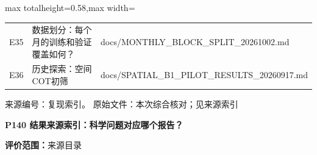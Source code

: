 \documentclass[UTF8,a4paper,landscape,10pt]{ctexart}
\begin{document}
\begin{center}
\begin{adjustbox}{max totalheight=0.58\textheight,max width=\linewidth}
\begin{minipage}{\linewidth}
\begin{tabularx}{\linewidth}{>{\hsize=0.3000\hsize\raggedright\arraybackslash}X>{\hsize=0.9000\hsize\raggedright\arraybackslash}X>{\hsize=1.8000\hsize\raggedright\arraybackslash}X}
E35 & 数据划分：每个月的训练和验证覆盖如何？ & docs/\allowbreak{}MONTHLY\_\allowbreak{}BLOCK\_\allowbreak{}SPLIT\_\allowbreak{}20261002.md \\
E36 & 历史探索：空间COT初筛 & docs/\allowbreak{}SPATIAL\_\allowbreak{}B1\_\allowbreak{}PILOT\_\allowbreak{}RESULTS\_\allowbreak{}20260917.md \\
\bottomrule\end{tabularx}\end{minipage}\end{adjustbox}\end{center}
\vfill{\scriptsize\color{muted} 来源编号：复现索引。 原始文件：本次综合核对；见来源索引}\par
\clearpage
{\large\bfseries\color{ink} P140  结果来源索引：科学问题对应哪个报告？}\par
{}\par
{\small\color{muted}\textbf{评价范围：}来源目录}\par\vspace{3mm}
\end{document}
